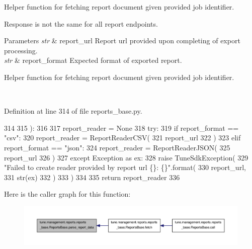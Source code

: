 Helper function for fetching report document given provided job identifier. 

Response is not the same for all report endpoints.


\begin{DoxyParams}{Parameters}
{\em str} & report\-\_\-url Report url provided upon completing of export processing. \\
\hline
{\em str} & report\-\_\-format Expected format of exported report. \begin{DoxyVerb}   Helper function for fetching report document given provided job identifier.\end{DoxyVerb}
 \\
\hline
\end{DoxyParams}


Definition at line 314 of file reports\-\_\-base.\-py.


\begin{DoxyCode}
314 
315     ):
316 
317         report\_reader = \textcolor{keywordtype}{None}
318         \textcolor{keywordflow}{try}:
319             \textcolor{keywordflow}{if} report\_format == \textcolor{stringliteral}{"csv"}:
320                 report\_reader = ReportReaderCSV(
321                     report\_url
322                 )
323             \textcolor{keywordflow}{elif} report\_format == \textcolor{stringliteral}{"json"}:
324                 report\_reader = ReportReaderJSON(
325                     report\_url
326                 )
327         \textcolor{keywordflow}{except} Exception \textcolor{keyword}{as} ex:
328             \textcolor{keywordflow}{raise} TuneSdkException(
329                 \textcolor{stringliteral}{"Failed to create reader provided by report url \{\}: \{\}"}.format(
330                     report\_url,
331                     str(ex)
332                 )
333             )
334 
335         \textcolor{keywordflow}{return} report\_reader
336 
\end{DoxyCode}


Here is the caller graph for this function\-:
\nopagebreak
\begin{figure}[H]
\begin{center}
\leavevmode
\includegraphics[width=350pt]{classtune_1_1management_1_1reports_1_1reports__base_1_1ReportsBase_ab256e31b545798be9e0d3a00513bcf7a_icgraph}
\end{center}
\end{figure}




